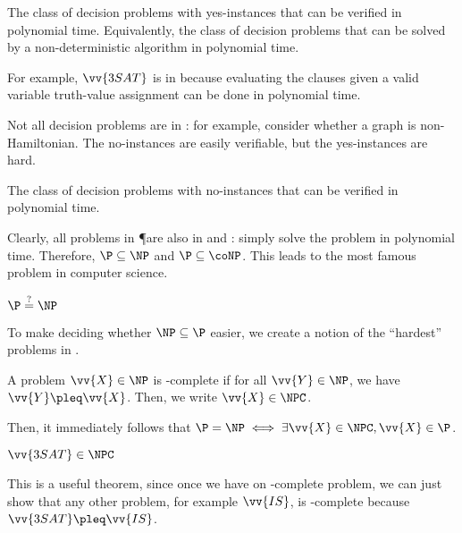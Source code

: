 \begin{defn}[\NP]
  The class of decision problems with yes-instances
  that can be verified in polynomial time.
  Equivalently, the class of decision problems that can be solved
  by a non-deterministic algorithm in polynomial time.
\end{defn}

For example, $\vv{3SAT}$ is in \NP because evaluating the clauses
given a valid variable truth-value assignment can be done in polynomial time.

Not all decision problems are in \NP:
for example, consider whether a graph is non-Hamiltonian.
The no-instances are easily verifiable, but the yes-instances are hard.

\begin{defn}[\coNP]
  The class of decision problems with no-instances
  that can be verified in polynomial time.
\end{defn}

Clearly, all problems in \P are also in \NP and \coNP:
simply solve the problem in polynomial time.
Therefore, $\P \subseteq \NP$ and $\P \subseteq \coNP$.
This leads to the most famous problem in computer science.

\begin{conjecture}
  $\P \stackrel{?}{=} \NP$
\end{conjecture}

To make deciding whether $\NP \subseteq \P$ easier,
we create a notion of the ``hardest'' problems in \NP.

\begin{defn}[\NP-complete]
  A problem $\vv{X} \in \NP$ is \NP-complete if for all $\vv{Y} \in \NP$,
  we have $\vv{Y} \pleq \vv{X}$.
  Then, we write $\vv{X} \in \NPC$.
\end{defn}

Then, it immediately follows that $\P = \NP \iff \exists\vv{X} \in \NPC, \vv{X} \in \P$.

\begin{theorem}\label{thm:c:3sat}
  $\vv{3SAT} \in \NPC$
\end{theorem}

This is a useful theorem, since once we have on \NP-complete problem,
we can just show that any other problem, for example $\vv{IS}$,
is \NP-complete because $\vv{3SAT} \pleq \vv{IS}$.

